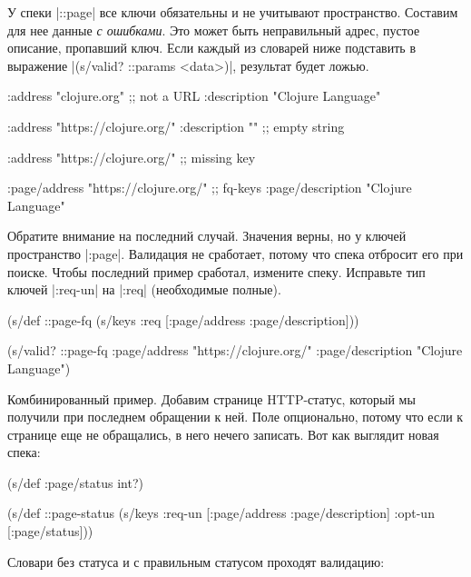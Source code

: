 У спеки \spverb|::page| все ключи обязательны и не учитывают
пространство. Составим для нее данные \emph{с ошибками}. Это может быть
неправильный адрес, пустое описание, пропавший ключ. Если каждый из словарей
ниже подставить в выражение \spverb|(s/valid? ::params <data>)|, результат будет
ложью.

\begin{english}
  \begin{clojure}
{:address "clojure.org" ;; not a URL
 :description "Clojure Language"}

{:address "https://clojure.org/"
 :description ""} ;; empty string

{:address "https://clojure.org/"} ;; missing key

{:page/address "https://clojure.org/" ;; fq-keys
 :page/description "Clojure Language"}
  \end{clojure}
\end{english}

Обратите внимание на последний случай. Значения верны, но у ключей пространство
\spverb|:page|. Валидация не сработает, потому что спека отбросит его при
поиске. Чтобы последний пример сработал, измените спеку. Исправьте тип ключей
\spverb|:req-un| на \spverb|:req| (необходимые полные).

\begin{english}
  \begin{clojure}
(s/def ::page-fq
  (s/keys :req [:page/address
                :page/description]))

(s/valid? ::page-fq
          {:page/address "https://clojure.org/"
           :page/description "Clojure Language"})
  \end{clojure}
\end{english}

Комбинированный пример. Добавим странице HTTP-статус, который мы получили при
последнем обращении к ней. Поле опционально, потому что если к странице еще не
обращались, в него нечего записать. Вот как выглядит новая спека:

\begin{english}
  \begin{clojure}
(s/def :page/status int?)

(s/def ::page-status
  (s/keys :req-un [:page/address
                   :page/description]
          :opt-un [:page/status]))
  \end{clojure}
\end{english}

Словари без статуса и с правильным статусом проходят валидацию:

